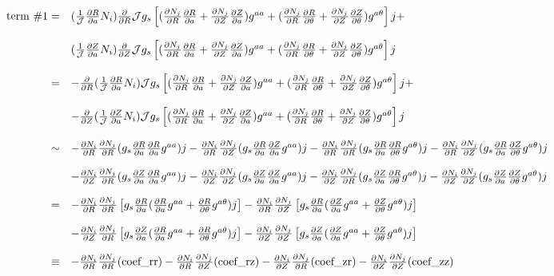 \documentclass{report}
\newcommand{\ff}[2]{\frac{#1}{#2}}
\newcommand{\pp}[2]{\frac{\partial{#1}}{\partial{#2}}}
\begin{document}
\begin{equation}
\label{eq:poisson7-term1}
   \begin{array}{rl}
\mbox{term \#1}=
& (\ff{1}{\cal J} \pp{R}{a} N_i) \pp{}{R} {\cal J} g_s \left[ 
           (\pp{N_j}{R} \pp{R}{a}      + \pp{N_j}{Z} \pp{Z}{a}) g^{a a} + 
           (\pp{N_j}{R} \pp{R}{\theta} + \pp{N_j}{Z} \pp{Z}{\theta}) g^{a \theta}
                                        \right] j +
\\
& \\
& (\ff{1}{\cal J} \pp{Z}{a} N_i) \pp{}{Z} {\cal J} g_s \left[ 
           (\pp{N_j}{R} \pp{R}{a}      + \pp{N_j}{Z} \pp{Z}{a}) g^{a a} + 
           (\pp{N_j}{R} \pp{R}{\theta} + \pp{N_j}{Z} \pp{Z}{\theta}) g^{a \theta}
                                        \right] j
\\
& \\
=&
 -\pp{}{R} (\ff{1}{\cal J} \pp{R}{a} N_i)  {\cal J} g_s \left[ 
           (\pp{N_j}{R} \pp{R}{a}      + \pp{N_j}{Z} \pp{Z}{a}) g^{a a} + 
           (\pp{N_j}{R} \pp{R}{\theta} + \pp{N_j}{Z} \pp{Z}{\theta}) g^{a \theta}
                                        \right] j +
\\
& \\
&-\pp{}{Z} (\ff{1}{\cal J} \pp{Z}{a} N_i)  {\cal J} g_s \left[ 
           (\pp{N_j}{R} \pp{R}{a}      + \pp{N_j}{Z} \pp{Z}{a}) g^{a a} + 
           (\pp{N_j}{R} \pp{R}{\theta} + \pp{N_j}{Z} \pp{Z}{\theta}) g^{a \theta}
                                        \right] j
\\
& \\
\sim&
 -\pp{N_i}{R}\pp{N_j}{R} (g_s \pp{R}{a} \pp{R}{a} g^{a a}) j
 -\pp{N_i}{R}\pp{N_j}{Z} (g_s \pp{R}{a} \pp{Z}{a} g^{a a}) j
 -\pp{N_i}{R}\pp{N_j}{R} (g_s \pp{R}{a} \pp{R}{\theta} g^{a \theta}) j
 -\pp{N_i}{R}\pp{N_j}{Z} (g_s \pp{R}{a} \pp{Z}{\theta} g^{a \theta}) j
\\
& \\
&
 -\pp{N_i}{Z}\pp{N_j}{R} (g_s \pp{Z}{a} \pp{R}{a} g^{a a}) j
 -\pp{N_i}{Z}\pp{N_j}{Z} (g_s \pp{Z}{a} \pp{Z}{a} g^{a a}) j
 -\pp{N_i}{Z}\pp{N_j}{R} (g_s \pp{Z}{a} \pp{R}{\theta} g^{a \theta}) j
 -\pp{N_i}{Z}\pp{N_j}{Z} (g_s \pp{Z}{a} \pp{Z}{\theta} g^{a \theta}) j
\\
& \\
=&
 -\pp{N_i}{R}\pp{N_j}{R} \left[g_s \pp{R}{a} (\pp{R}{a} g^{a a} + \pp{R}{\theta} g^{a \theta}) j \right]
 -\pp{N_i}{R}\pp{N_j}{Z} \left[g_s \pp{R}{a} (\pp{Z}{a} g^{a a} + \pp{Z}{\theta} g^{a \theta}) j \right]
\\
& \\
&
 -\pp{N_i}{Z}\pp{N_j}{R} \left[g_s \pp{Z}{a} (\pp{R}{a} g^{a a} + \pp{R}{\theta} g^{a \theta}) j \right]
 -\pp{N_i}{Z}\pp{N_j}{Z} \left[g_s \pp{Z}{a} (\pp{Z}{a} g^{a a} + \pp{Z}{\theta} g^{a \theta}) j \right]
\\
& \\
\equiv&
 -\pp{N_i}{R}\pp{N_j}{R} (\mbox{coef\_rr})
 -\pp{N_i}{R}\pp{N_j}{Z} (\mbox{coef\_rz})
 -\pp{N_i}{Z}\pp{N_j}{R} (\mbox{coef\_zr})
 -\pp{N_i}{Z}\pp{N_j}{Z} (\mbox{coef\_zz})
   \end{array}
\end{equation}
\end{document}
